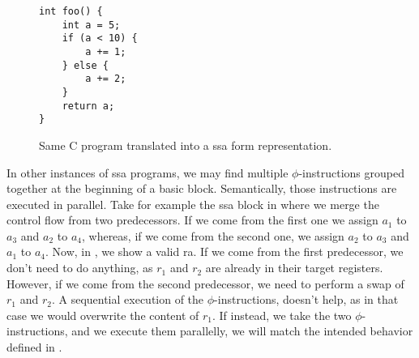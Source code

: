\begin{figure}[ht]
\centering
\begin{minipage}{0.38\textwidth}
\lstset{style=C}
\begin{lstlisting}[caption={C program merging variables at line 8.}, label={fig:ssabefore}]
int foo() {
    int a = 5;
    if (a < 10) {
        a += 1;
    } else {
        a += 2;
    }
    return a;
}
\end{lstlisting}
\end{minipage}
\hfill
\begin{minipage}{0.58\textwidth}
  \centering
  \caption{Same C program translated into a \gls{ssa} form representation.}
  \label{fig:ssaafter}
\end{minipage}
\end{figure}

In other instances of \gls{ssa} programs, we may find multiple $\phi$-instructions grouped together at the beginning of a basic block. Semantically, those instructions are executed in parallel.
Take for example the \gls{ssa} block in  where we merge the control flow from two predecessors. If we come from the first one we assign $a_1$ to $a_3$ and $a_2$ to $a_4$, whereas, if we come from the second one, we assign $a_2$ to $a_3$ and $a_1$ to $a_4$. Now, in , we show a valid \gls{ra}. If we come from the first predecessor, we don't need to do anything, as $r_1$ and $r_2$ are already in their target registers.
However, if we come from the second predecessor, we need to perform a swap of $r_1$ and $r_2$. A sequential execution of the $\phi$-instructions, doesn't help, as in that case we would overwrite the content of $r_1$. If instead, we take the two $\phi$-instructions, and we execute them parallelly, we will match the intended behavior defined in .

